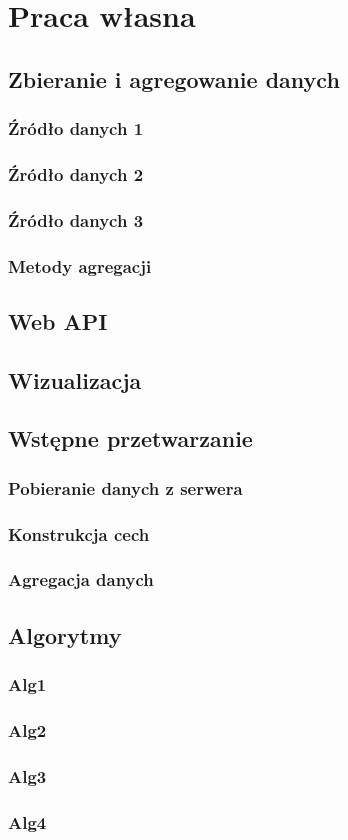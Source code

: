 \chapter{Praca własna}
    \section{Zbieranie i agregowanie danych}
        \subsection{Źródło danych 1}
        \subsection{Źródło danych 2}
        \subsection{Źródło danych 3}
        \subsection{Metody agregacji}
    \section{Web API}
    \section{Wizualizacja}
    \section{Wstępne przetwarzanie}
        \subsection{Pobieranie danych z serwera}
        \subsection{Konstrukcja cech}
        \subsection{Agregacja danych}
    \section{Algorytmy}
        \subsection{Alg1}
        \subsection{Alg2}
        \subsection{Alg3}
        \subsection{Alg4}